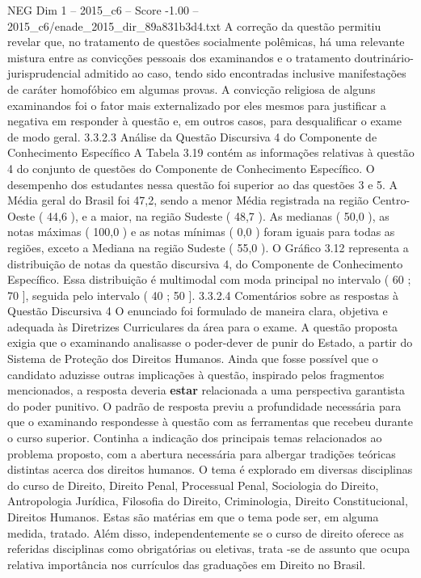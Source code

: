 \begin{textsample}{NEG Dim 1 – 2015\_c6 – Score -1.00 – 2015\_c6/enade\_2015\_dir\_89a831b3d4.txt}
A correção da questão permitiu revelar que, no tratamento de questões socialmente polêmicas, há uma relevante mistura entre as convicções pessoais dos examinandos e o tratamento doutrinário-jurisprudencial admitido ao caso, tendo sido encontradas inclusive manifestações de caráter homofóbico em algumas provas.
A convicção religiosa de alguns examinandos foi o fator mais externalizado por eles mesmos para justificar a negativa em responder à questão e, em outros casos, para desqualificar o exame de modo geral. 3.3.2.3 Análise da Questão Discursiva 4 do Componente de Conhecimento Específico A Tabela 3.19 contém as informações relativas à questão 4 do conjunto de questões do Componente de Conhecimento Específico.
O desempenho dos estudantes nessa questão foi superior ao das questões 3 e 5.
A Média geral do Brasil foi 47,2, sendo a menor Média registrada na região Centro-Oeste ( 44,6 ), e a maior, na região Sudeste ( 48,7 ).
As medianas ( 50,0 ), as notas máximas ( 100,0 ) e as notas mínimas ( 0,0 ) foram iguais para todas as regiões, exceto a Mediana na região Sudeste ( 55,0 ).
O Gráfico 3.12 representa a distribuição de notas da questão discursiva 4, do Componente de Conhecimento Específico.
Essa distribuição é multimodal com moda principal no intervalo ( 60 ; 70 ], seguida pelo intervalo ( 40 ; 50 ]. 3.3.2.4 Comentários sobre as respostas à Questão Discursiva 4 O enunciado foi formulado de maneira clara, objetiva e adequada às Diretrizes Curriculares da área para o exame.
A questão proposta exigia que o examinando analisasse o poder-dever de punir do Estado, a partir do Sistema de Proteção dos Direitos Humanos.
Ainda que fosse possível que o candidato aduzisse outras implicações à questão, inspirado pelos fragmentos mencionados, a resposta deveria \textbf{estar} relacionada a uma perspectiva garantista do poder punitivo.
O padrão de resposta previu a profundidade necessária para que o examinando respondesse à questão com as ferramentas que recebeu durante o curso superior.
Continha a indicação dos principais temas relacionados ao problema proposto, com a abertura necessária para albergar tradições teóricas distintas acerca dos direitos humanos.
O tema é explorado em diversas disciplinas do curso de Direito, Direito Penal, Processual Penal, Sociologia do Direito, Antropologia Jurídica, Filosofia do Direito, Criminologia, Direito Constitucional, Direitos Humanos.
Estas são matérias em que o tema pode ser, em alguma medida, tratado.
Além disso, independentemente se o curso de direito oferece as referidas disciplinas como obrigatórias ou eletivas, trata -se de assunto que ocupa relativa importância nos currículos das graduações em Direito no Brasil.

\end{textsample}
